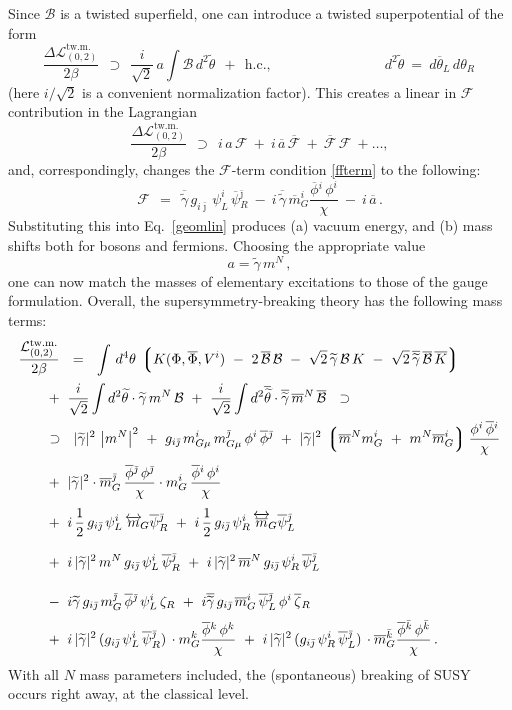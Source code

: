 \documentclass[12pt]{article}
\newcommand{\wt}{\widetilde}
\newcommand{\ov}{\overline}
\newcommand{\mc}[1]{\mathcal{#1}}
\newcommand{\lgr}{\left\lgroup}
\newcommand{\rgr}{\right\rgroup}
\newcommand{\bzr}{\ov{\zeta}{}_R}
\newcommand{\zr}{\zeta_R}
\newcommand{\tgamma}{\wt{\gamma}}
\newcommand{\btgamma}{\ov{\tgamma}}
\newcommand{\bpsi}{\ov{\psi}{}}
\newcommand{\bphi}{\ov{\phi}{}}
\newcommand{\ff}{\mc{F}}
\newcommand{\bff}{\ov{\mc{F}}}
\newcommand{\bj}{{\bar \jmath}}
\newcommand{\bk}{{\bar k}}
\begin{document}
	Since $ \mc{B} $ is a twisted superfield, one can introduce a twisted superpotential of the form
\[
	\frac{\Delta\mc{L}^\text{tw.m.}_{(0,2)}}{2\beta} ~~\supset~~
	\frac{i}{\sqrt{2}}\,a \int \mc{B}\, d^2\wt{\theta} ~~+~~ \text{h.c.},
	\qquad\qquad\qquad\qquad d^2\wt{\theta} ~=~ d\ov{\theta}{}_L\,d\theta_R\,
\]
	(here $ i/\sqrt{2} $ is a convenient normalization factor).
	This creates a linear in $ \ff $ contribution in the Lagrangian
\[
	\frac{\Delta\mc{L}_{(0,2)}^\text{tw.m.}}
             {2\beta} ~~\supset~~ i\,a\,\ff ~+~ i\,\ov{a}\,\bff ~+~ \bff\,\ff ~+ \dots,
\]
	and, correspondingly, changes the $ \ff $-term condition \eqref{ffterm} to the following:
\[
	\ff ~~=~~ \btgamma\, g_{i\bj}\, \psi_L^i\, \bpsi_R^\bj 
		~-~ i\, \btgamma\, \ov{m}_G^i \frac{\bphi^i\, \phi^i}{\chi}
		~-~ i\, \ov{a}\,.
\]
	Substituting this into Eq.~\eqref{geomlin} produces (a) vacuum energy, and (b) mass shifts both for
	bosons and fermions.
	Choosing the appropriate value $$ a = \tgamma\,m^N \,,$$ one can now match the masses
	of elementary excitations  to those of the
	gauge formulation.
	Overall, the supersymmetry-breaking theory has the following mass terms:
\begin{align}
%
\notag
	\frac{\mc{L}_{(0,2)}^\text{tw.m.}}{2\beta} & 
	~~=~~ \int\, d^4\theta\, \lgr K(\Phi,\ov{\Phi}, V^i) 
		~-~ 2\, \ov{\mc{B}}\,\mc{B}  
		~-~  \sqrt{2}\, \tgamma\,\mc{B}\,K  ~-~ \sqrt{2}\, \ov{\tgamma}\,\ov{\mc{B}}\,\ov{K} \rgr
	\\[0.5mm]
%
\notag
	&\!\!\!\!\!\!\!\!
	~+~ \frac{i}{\sqrt{2}} \int d^2\wt{\theta} \cdot \tgamma\,m^N\,\mc{B} 
	~+~ \frac{i}{\sqrt{2}} \int d^2\ov{\wt{\theta}} \cdot \btgamma\, \ov{m}{}^N\, \ov{\mc{B}}
	~~\supset~~
	\\
%
\notag
	&\!\!\!\!\!\!\!\!
	~\supset~~
	|\tgamma|^2\, \left|m^N\right|^2 
	~+~ g_{i\bj}\, m_{G\mu}^i\, m_{G\mu}^\bj\, \phi^i\, \bphi^\bj
	~+~ |\tgamma|^2\, \lgr \ov{m}{}^N m_G^i ~+~ m^N \ov{m}{}_G^i \rgr \frac {\phi^i\,\bphi^i}{\chi}
	\\[1mm]
%
\label{geom_mass}
	&\!\!\!\!\!\!\!\!
	~+~ |\tgamma|^2 \cdot \ov{m}{}_G^\bj\,\frac{\bphi^\bj\,\phi^\bj}{\chi}
			\cdot m_G^i\, \frac{\bphi^i\, \phi^i}{\chi}
	\\[1mm]
%
\notag
	&\!\!\!\!\!\!\!\!
	~+~ i\,\frac{1}{2}\,g_{i\bj}\,\psi_L^i\, \overleftrightarrow{m}{}_{\!G} \bpsi_R^\bj
	~+~ i\,\frac{1}{2}\,g_{i\bj}\,\psi_R^i\, \overleftrightarrow{\ov{m}}{}_{\!G} \bpsi_L^\bj
	\\[3mm]
%
\notag
	&\!\!\!\!\!\!\!\!
	~+~ i\,|\tgamma|^2\,m^N\,g_{i\bj}\,\psi_L^i\, \bpsi_R^\bj
	~+~ i\,|\tgamma|^2\,\ov{m}{}^N\,g_{i\bj}\,\psi_R^i\, \bpsi_L^\bj
	\\[4mm]
%
\notag
	&\!\!\!\!\!\!\!\!
	~-~ i\tgamma\, g_{i\bj}\, m_G^\bj\,\bphi^\bj\, \psi_L^i\,\zr
	~+~ i\btgamma\, g_{i\bj}\,\ov{m}{}_G^i\, \bpsi_L^\bj\, \phi^i\,\bzr
	\\[1mm]
%
\notag
	&\!\!\!\!\!\!\!\!
	~+~ i\, |\tgamma|^2\, (g_{i\bj}\,\psi_L^i\,\bpsi_R^\bj)\, \cdot m_G^k \frac{\bphi^k\, \phi^k}{\chi}
	~+~ i\, |\tgamma|^2\, (g_{i\bj}\,\psi_R^i\,\bpsi_L^\bj)\, \cdot \ov{m}{}_G^\bk \frac{\bphi^\bk\,\phi^\bk}{\chi}
	\,.
\end{align}
With all $N$ mass parameters included, the (spontaneous) breaking of SUSY occurs right away, 
at the classical level.
\end{document}
